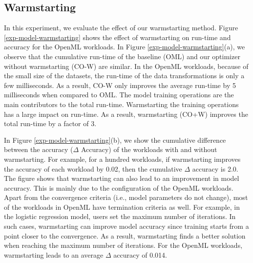 \subsection{Warmstarting}
In this experiment, we evaluate the effect of our warmstarting method.
Figure \ref{exp-model-warmstarting} shows the effect of warmstarting on run-time and accuracy for the OpenML workloads.
In Figure \ref{exp-model-warmstarting}(a), we observe that the cumulative run-time of the baseline (OML) and our optimizer without warmstarting (CO-W) are similar.
In the OpenML workloads, because of the small size of the datasets, the run-time of the data transformations is only a few milliseconds.
As a result, CO-W only improves the average run-time by 5 milliseconds when compared to OML.
The model training operations are the main contributors to the total run-time.
Warmstarting the training operations has a large impact on run-time.
As a result, warmstarting (CO+W) improves the total run-time by a factor of 3.

In Figure \ref{exp-model-warmstarting}(b), we show the cumulative difference between the accuracy ($\Delta$ Accuracy) of the workloads with and without warmstarting.
For example, for a hundred workloads, if warmstarting improves the accuracy of each workload by 0.02, then the cumulative $\Delta$ accuracy is 2.0.
The figure shows that warmstarting can also lead to an improvement in model accuracy.
This is mainly due to the configuration of the OpenML workloads.
Apart from the convergence criteria (i.e., model parameters do not change), most of the workloads in OpenML have termination criteria as well.
For example, in the logistic regression model, users set the maximum number of iterations.
In such cases, warmstarting can improve model accuracy since training starts from a point closer to the convergence.
As a result, warmstarting finds a better solution when reaching the maximum number of iterations.
For the OpenML workloads, warmstarting leads to an average $\Delta$ accuracy of 0.014.